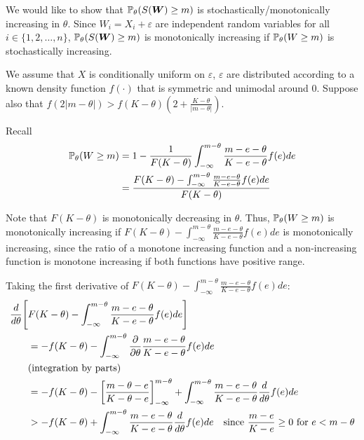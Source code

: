 
We would like to show that $\mathbb{P}_\theta(S(\bm{W}) \geq m)$ is stochastically/monotonically increasing in $\theta$. Since $W_i = X_i + \varepsilon$ are independent random variables for all $i \in \{1, 2, \dots, n\}$, $\mathbb{P}_\theta(S(\bm{W}) \geq m)$ is monotonically increasing if $\mathbb{P}_\theta(W \geq m)$ is stochastically increasing.

We assume that $X$ is conditionally uniform on $\varepsilon$, $\varepsilon$ are distributed according to a known density function $f(\cdot)$ that is symmetric and unimodal around 0. Suppose also that $f(2|m-\theta|) > f(K-\theta) \left(2 + \frac{K-\theta}{|m-\theta|} \right)$.

Recall \begin{align*}
    \mathbb{P}_\theta(W \geq m) &= 1 - \frac{1}{F(K-\theta)} \int^{m-\theta}_{-\infty} \frac{m-e-\theta}{K-e-\theta}f(e)de \\
    &= \frac{F(K-\theta) - \int^{m-\theta}_{-\infty} \frac{m-e-\theta}{K-e-\theta}f(e)de}{F(K-\theta)}
\end{align*}

Note that $F(K-\theta)$ is monotonically decreasing in $\theta$. Thus, $\mathbb{P}_\theta(W \geq m)$ is monotonically increasing if $F(K-\theta) - \int^{m-\theta}_{-\infty} \frac{m-e-\theta}{K-e-\theta}f(e)de$ is monotonically increasing, since the ratio of a monotone increasing function and a non-increasing function is monotone increasing if both functions have positive range.

Taking the first derivative of $F(K-\theta) - \int^{m-\theta}_{-\infty} \frac{m-e-\theta}{K-e-\theta}f(e)de$:
\begingroup
\allowdisplaybreaks
\begin{align*}
    \frac{d}{d\theta}\Bigg[ &F(K-\theta) - \int^{m-\theta}_{-\infty} \frac{m-e-\theta}{K-e-\theta}f(e)de \Bigg] \\
        &= -f(K-\theta) - \int^{m-\theta}_{-\infty} \frac{\partial}{\partial\theta} \frac{m-e-\theta}{K-e-\theta}f(e)de \\
        &\text{(integration by parts)} \\
        &= -f(K-\theta) - \left[ \frac{m-\theta-e}{K-\theta-e} \right]^{m-\theta}_{-\infty} + \int^{m-\theta}_{-\infty} \frac{m-e-\theta}{K-e-\theta} \frac{d}{d\theta} f(e)de \\
        &> -f(K-\theta) + \int^{m-\theta}_{-\infty} \frac{m-e-\theta}{K-e-\theta} \frac{d}{d\theta} f(e)de 
 \quad \text{since $\frac{m-e}{K-e} \geq 0$ for $e < m-\theta$}
\end{align*}
\endgroup

